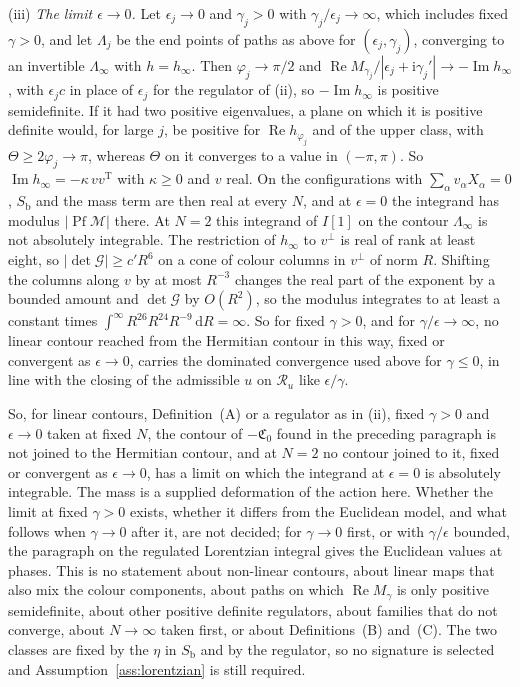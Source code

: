 (iii) \emph{The limit \(\epsilon\to0\).} Let \(\epsilon_j\to0\) and \(\gamma_j>0\) with \(\gamma_j/\epsilon_j\to\infty\), which includes fixed \(\gamma>0\), and let \(\Lambda_j\) be the end points of paths as above for \((\epsilon_j,\gamma_j)\), converging to an invertible \(\Lambda_\infty\) with \(h=h_\infty\). Then \(\varphi_j\to\pi/2\) and \(\operatorname{Re}M_{\gamma_j}/|\epsilon_j+\mathrm i\gamma_j'|\to-\operatorname{Im}h_\infty\), with \(\epsilon_jc\) in place of \(\epsilon_j\) for the regulator of (ii), so \(-\operatorname{Im}h_\infty\) is positive semidefinite. If it had two positive eigenvalues, a plane on which it is positive definite would, for large \(j\), be positive for \(\operatorname{Re}h_{\varphi_j}\) and of the upper class, with \(\Theta\ge2\varphi_j\to\pi\), whereas \(\Theta\) on it converges to a value in \((-\pi,\pi)\). So \(\operatorname{Im}h_\infty=-\kappa\,vv^{\mathrm T}\) with \(\kappa\ge0\) and \(v\) real. On the configurations with \(\sum_\alpha v_\alpha X_\alpha=0\), \(S_{\mathrm b}\) and the mass term are then real at every \(N\), and at \(\epsilon=0\) the integrand has modulus \(|\operatorname{Pf}\mathcal M|\) there. At \(N=2\) this integrand of \(I[1]\) on the contour \(\Lambda_\infty\) is not absolutely integrable. The restriction of \(h_\infty\) to \(v^\perp\) is real of rank at least eight, so \(|\det\mathcal G|\ge c'R^6\) on a cone of colour columns in \(v^\perp\) of norm \(R\). Shifting the columns along \(v\) by at most \(R^{-3}\) changes the real part of the exponent by a bounded amount and \(\det\mathcal G\) by \(O(R^2)\), so the modulus integrates to at least a constant times \(\int^\infty R^{26}R^{24}R^{-9}\,\mathrm dR=\infty\). So for fixed \(\gamma>0\), and for \(\gamma/\epsilon\to\infty\), no linear contour reached from the Hermitian contour in this way, fixed or convergent as \(\epsilon\to0\), carries the dominated convergence used above for \(\gamma\le0\), in line with the closing of the admissible \(u\) on \(\mathcal R_u\) like \(\epsilon/\gamma\).

So, for linear contours, Definition~(A) or a regulator as in (ii), fixed \(\gamma>0\) and \(\epsilon\to0\) taken at fixed \(N\), the contour of \(-\mathfrak C_0\) found in the preceding paragraph is not joined to the Hermitian contour, and at \(N=2\) no contour joined to it, fixed or convergent as \(\epsilon\to0\), has a limit on which the integrand at \(\epsilon=0\) is absolutely integrable. The mass is a supplied deformation of the action here. Whether the limit at fixed \(\gamma>0\) exists, whether it differs from the Euclidean model, and what follows when \(\gamma\to0\) after it, are not decided; for \(\gamma\to0\) first, or with \(\gamma/\epsilon\) bounded, the paragraph on the regulated Lorentzian integral gives the Euclidean values at phases. This is no statement about non-linear contours, about linear maps that also mix the colour components, about paths on which \(\operatorname{Re}M_\gamma\) is only positive semidefinite, about other positive definite regulators, about families that do not converge, about \(N\to\infty\) taken first, or about Definitions~(B) and~(C). The two classes are fixed by the \(\eta\) in \(S_{\mathrm b}\) and by the regulator, so no signature is selected and Assumption~\ref{ass:lorentzian} is still required.
